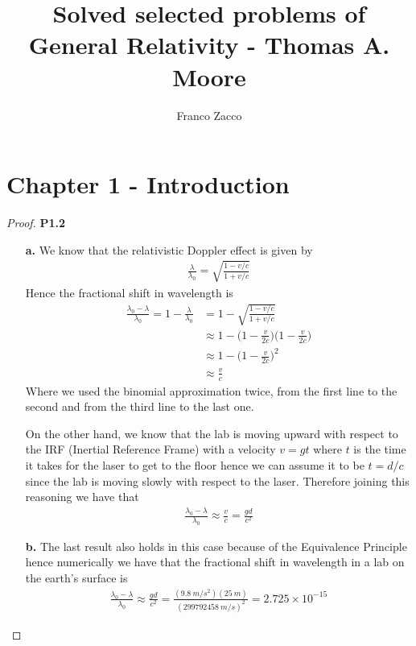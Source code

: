 \documentclass[11pt]{article}
\title{\textbf{Solved selected problems of General Relativity - Thomas A. Moore}}
\author{Franco Zacco}
\date{}
\theoremstyle{definition}
\begin{document}
\maketitle
\thispagestyle{empty}

\section*{Chapter 1 - Introduction}

\begin{proof}{\textbf{P1.2}}
\begin{itemize}
    \item [\textbf{a.}] We know that the relativistic Doppler effect is given
    by
    \begin{align*}
        \frac{\lambda}{\lambda_0} = \sqrt{\frac{1-v/c}{1 + v/c}}
    \end{align*}
    Hence the fractional shift in wavelength is
    \begin{align*}
        \frac{\lambda_0 - \lambda}{\lambda_0} = 1 -\frac{\lambda}{\lambda_0} 
        &= 1 -\sqrt{\frac{1-v/c}{1 + v/c}}\\
        &\approx 1 - \bigg(1-\frac{v}{2c}\bigg)\bigg(1-\frac{v}{2c}\bigg)\\
        &\approx 1 - \bigg(1-\frac{v}{2c}\bigg)^2\\
        &\approx \frac{v}{c}
    \end{align*}
    Where we used the binomial approximation twice, from the first line
    to the second and from the third line to the last one.

    On the other hand, we know that the lab is moving upward with respect to
    the IRF (Inertial Reference Frame) with a velocity $v = gt$ where $t$ is 
    the time it takes for the laser to get to the floor hence we can assume
    it to be $t = d/c$ since the lab is moving slowly with respect to
    the laser. Therefore joining this reasoning we have that
    \begin{align*}
        \frac{\lambda_0 - \lambda}{\lambda_0}
        \approx \frac{v}{c} = \frac{gd}{c^2}
    \end{align*}

    \item [\textbf{b.}] The last result also holds in this case because of the
    Equivalence Principle hence numerically we have that the fractional shift
    in wavelength in a lab on the earth's surface is
    \begin{align*}
        \frac{\lambda_0 - \lambda}{\lambda_0}
        \approx \frac{gd}{c^2}
        = \frac{(9.8~m/s^2)(25~m)}{(299792458~m/s)^2}
        = 2.725 \times 10^{-15} 
    \end{align*}


\end{itemize}
\end{proof}
\end{document}
